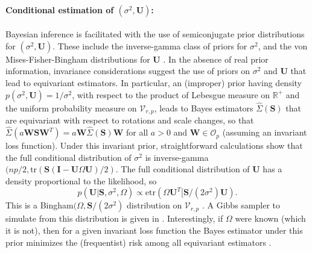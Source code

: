 \documentclass{article}
\newcommand{\bl}[1]{{\mathbf #1}}
\newcommand{\tr}{\text{tr}}
\newcommand{\etr}{\text{etr}}
\begin{document}
\paragraph{Conditional estimation of $(\sigma^2, \bl U)$:}
Bayesian inference is facilitated with the use of semiconjugate 
prior distributions  for $(\sigma^2, \bl U)$.
These include the inverse-gamma class of priors for $\sigma^2$, 
and the von Mises-Fisher-Bingham  
distributions for $\bl U$ \citep{hoff_2009a,hoff_2009b}.  
In the absence of real prior information,  invariance 
considerations suggest the use of priors on $\sigma^2$ and 
$\bl U$ that lead to equivariant estimators. 
In particular, an (improper) prior having density 
$p(\sigma^2,\bl U) = 1/\sigma^2 $, with respect to the 
product of Lebesgue measure on $\mathbb R^+$ and the 
uniform probability measure on $\mathcal V_{r,p}$, 
leads to Bayes estimators $\hat \Sigma(\bl S)$ that 
are equivariant with respect to 
rotations and scale changes, so that 
$\hat \Sigma(a \bl W \bl S \bl W^T) = 
   a \bl W \hat\Sigma(\bl S) \bl W$ for all 
$a>0$ and $\bl W\in \mathcal O_{p}$  
(assuming an invariant loss function).  
Under this invariant prior, straightforward calculations
show that the full conditional distribution of
$\sigma^2$ is
inverse-gamma$( n p/2 , \tr(\bl S(\bl I-\bl U\Omega\bl U)/2)$.
The full conditional distribution of $\bl U$ has a density proportional
to the likelihood, so
\[
 p(\bl U | \bl S, \sigma^2, \Omega) \propto 
  \etr( \Omega \bl U^T [\bl S/(2\sigma^2) \bl U). 
\]
This is a Bingham$(\Omega, \bl S/(2\sigma^2)$ distribution on
$\mathcal V_{r,p}$ \citep{khatri_mardia_1977}. A Gibbs sampler to
simulate from this distribution is given in
\citet{hoff_2009a}.
Interestingly, if $\Omega$ were known (which it is not), then 
for a given invariant loss function
the Bayes estimator under this prior 
minimizes the (frequentist) risk among all 
equivariant estimators \citep{eaton_1989}. 
\end{document}
